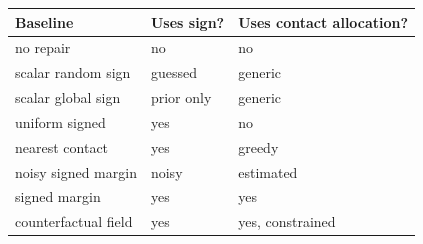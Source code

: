 \begin{tabular}{lll}\toprule
Baseline & Uses sign? & Uses contact allocation?\\
\midrule
no repair & no & no\\
scalar random sign & guessed & generic\\
scalar global sign & prior only & generic\\
uniform signed & yes & no\\
nearest contact & yes & greedy\\
noisy signed margin & noisy & estimated\\
signed margin & yes & yes\\
counterfactual field & yes & yes, constrained\\
\bottomrule\end{tabular}

